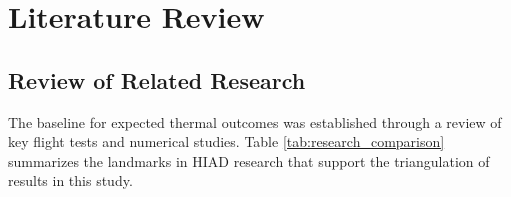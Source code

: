 \chapter{Literature Review}
\label{chap:literature}



\section{Review of Related Research}

The baseline for expected thermal outcomes was established through a review of key flight tests and numerical studies. Table \ref{tab:research_comparison} summarizes the landmarks in HIAD research that support the triangulation of results in this study.

